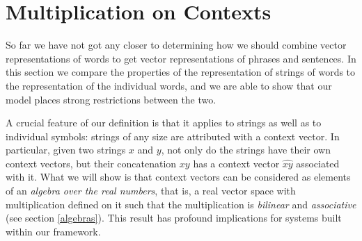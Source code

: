 
%



\section{Multiplication on Contexts}

So far we have not got any closer to determining how we should combine vector representations of words to get vector representations of phrases and sentences. In this section we compare the properties of the representation of strings of words to the representation of the individual words, and we are able to show that our model places strong restrictions between the two.


A crucial feature of our definition is that it applies to strings as well as to individual symbols: strings of any size are attributed with a context vector. In particular, given two strings $x$ and $y$, not only do the strings have their own context vectors, but their concatenation $xy$ has a context vector $\widehat{xy}$ associated with it.  What we will show is that context vectors can be considered as elements of an \emph{algebra over the real numbers}, that is, a real vector space with multiplication defined on it such that the multiplication is \emph{bilinear} and \emph{associative} (see section \ref{algebras}). This result has profound implications for systems built within our framework.

